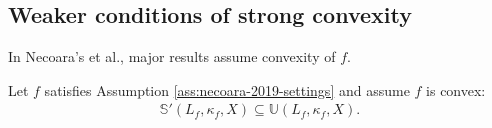 \documentclass[12pt]{report}
\begin{document}
        \subsection{Weaker conditions of strong convexity}
            In Necoara's et al., major results assume convexity of $f$. 
            \begin{theorem}\label{thm:qscnvx-means-qua}
                Let $f$ satisfies Assumption \ref{ass:necoara-2019-settings} and assume $f$ is convex: 
                \begin{align*}
                    \mathbb S'(L_f, \kappa_f, X) \subseteq \mathbb U(L_f, \kappa_f, X). 
                \end{align*}
            \end{theorem}
\end{document}
